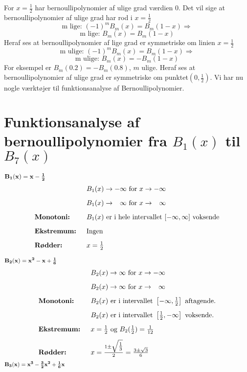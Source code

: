 For \(x=\frac{1}{2}\) har bernoullipolynomier af ulige grad  værdien \(0\). 
Det vil sige at  bernoullipolynomier af ulige grad har rod i \(x =\frac{1}{2}\)
\[\text{m lige: } (-1)^{m}B_{m}(x)=B_{m}(1-x) \Rightarrow\]
\begin{equation}
\text{m lige: }B_{m}(x)=B_{m}(1-x)
\end{equation}	
Heraf ses at bernoullipolynomier af lige grad er symmetriske om linien \(x=\frac{1}{2}\)
\[\text{m ulige: } (-1)^{m}B_{m}(x)=B_{m}(1-x) \Rightarrow\]
\begin{equation}
\text{m ulige: } B_{m}(x)=-B_{m}(1-x)
\end{equation}
For eksempel er \(B_{m}(0.2)=-B_{m}(0.8)\), \(m\) ulige.
Heraf ses at bernoullipolynomier af ulige grad er symmetriske om punktet\((0,\frac{1}{2})\).
Vi har nu nogle værktøjer til funktionsanalyse af Bernoullipolynomier.
\section{Funktionsanalyse af bernoullipolynomier fra \(B_{1}(x)\) til \(B_{7}(x)\) }
\[\mathbf{B_{1}(x)=x-\tfrac{1}{2}} \MinLinie\]
\begin{equation*}
\begin{array}{ll}
			&B_{1}(x) \rightarrow -\infty \text{ for } x \rightarrow -\infty\nylinie
			&B_{1}(x) \rightarrow \phantom{-}\infty \text{ for } x \rightarrow \phantom{-} \infty\nylinie
\textbf{Monotoni:} 	&B_{1}(x) \text{ er i hele  intervallet } [-\infty,\infty] \text{ voksende}\nylinie
\textbf{Ekstremum: }  &\text{Ingen}\nylinie
\textbf{Rødder:} 	&x=\tfrac{1}{2}
\end{array}
\end{equation*}

\[\mathbf{B_{2}(x)=x^2-x+\tfrac{1}{6}} \MinLinie\]
\begin{equation*}
\begin{array}{ll}
			&B_{2}(x) \rightarrow \infty \text{ for } x \rightarrow -\infty\nylinie
			&B_{2}(x) \rightarrow \infty \text{ for } x \rightarrow \phantom{-}\infty\nylinie
\textbf{Monotoni:}	&B_{2}(x) \text{ er i intervallet } \left[-\infty,\tfrac{1}{2}\right] \text{ aftagende.}\nylinie
			&B_{2}(x) \text{ er i intervallet } \left[\tfrac{1}{2},-\infty\right] \text{ voksende.}\nylinie
\textbf{Ekstremum: } 	&x=\tfrac{1}{2} \text{ og } B_{2}(\tfrac{1}{2})=\tfrac{1}{12}\nylinie
\textbf{Rødder: }	&x=\tfrac{1 \pm \sqrt{\tfrac{1}{3}}}{2}=\tfrac{3 \pm \sqrt{3}}{6}
\end{array}
\end{equation*}
\[\mathbf{B_{3}(x)=x^{3}-\tfrac{3}{2}x^{2}+\tfrac{1}{6}x} \MinLinie\]

